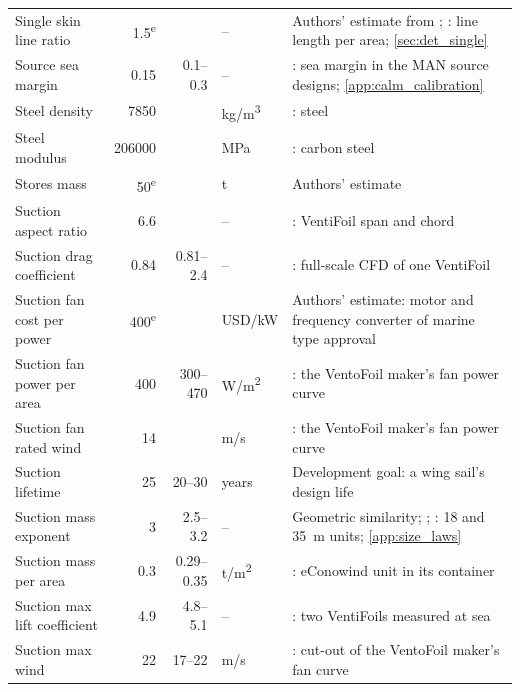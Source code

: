\begin{longtable}{@{}>{\raggedright\arraybackslash}p{3.4cm}rr>{\raggedright\arraybackslash}p{1.4cm}>{\raggedright\arraybackslash}p{5.8cm}@{}}
Single skin line ratio & \num{1.5}\textsuperscript{e} &  & -- & Authors' estimate from \citet{niviuk_skin3}; \citet{niviuk_ikumap}: line length per area; \cref{sec:det_single} \\
Source sea margin & \num{0.15} & \num{0.1}--\num{0.3} & -- & \citet{man2022bulk}: sea margin in the MAN source designs; \cref{app:calm_calibration} \\
Steel density & \num{7850} &  & kg/m\textsuperscript{3} & \citet[Table 6]{joshi2025}: steel \\
Steel modulus & \num{206000} &  & MPa & \citet[Sec 5, Tab 1, Note 1]{bv2026nr206}: carbon steel \\
Stores mass & \num{50}\textsuperscript{e} &  & t & Authors' estimate \\
Suction aspect ratio & \num{6.6} &  & -- & \citet{conoship2022econowind}: VentiFoil span and chord \\
Suction drag coefficient & \num{0.84} & \num{0.81}--\num{2.4} & -- & \citet[Table 5.1]{lagendijk2018}: full-scale CFD of one VentiFoil \\
Suction fan cost per power & \num{400}\textsuperscript{e} &  & USD/kW & Authors' estimate: motor and frequency converter of marine type approval \\
Suction fan power per area & \num{400} & \num{300}--\num{470} & W/m\textsuperscript{2} & \citet[Fig. 3.11]{smeets2024ventofoil}: the VentoFoil maker's fan power curve \\
Suction fan rated wind & \num{14} &  & m/s & \citet[Fig. 3.11]{smeets2024ventofoil}: the VentoFoil maker's fan power curve \\
Suction lifetime & \num{25} & \num{20}--\num{30} & years & Development goal: a wing sail's design life \\
Suction mass exponent & \num{3} & \num{2.5}--\num{3.2} & -- & Geometric similarity; \citet{econowind2026vf3}; \citet{econowind2026vf5}: 18 and 35~m units; \cref{app:size_laws} \\
Suction mass per area & \num{0.3} & \num{0.29}--\num{0.35} & t/m\textsuperscript{2} & \citet{conoship2022econowind}: eConowind unit in its container \\
Suction max lift coefficient & \num{4.9} & \num{4.8}--\num{5.1} & -- & \citet[Fig. 12]{ghorbani2024suction}: two VentiFoils measured at sea \\
Suction max wind & \num{22} & \num{17}--\num{22} & m/s & \citet[Fig. 3.11]{smeets2024ventofoil}: cut-out of the VentoFoil maker's fan curve \\

\end{longtable}
